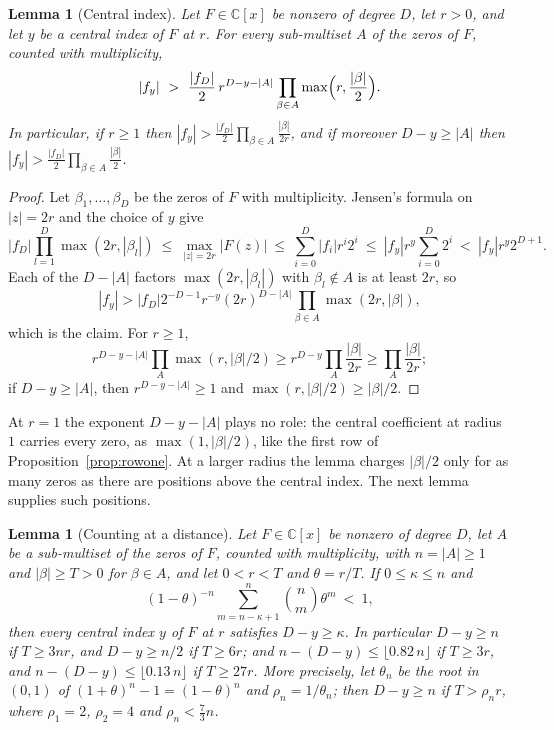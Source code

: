 \documentclass[11pt]{article}
\newtheorem{lemma}[theorem]{Lemma}
\begin{document}
\begin{lemma}[Central index]\label{lem:central}
Let $F\in\mathbb C[x]$ be nonzero of degree $D$, let $r>0$, and let $y$ be a
central index of $F$ at $r$.  For every sub-multiset $A$ of the zeros of $F$,
counted with multiplicity,
\[
  |f_y|\ >\ \frac{|f_D|}2\,r^{D-y-|A|}\prod_{\beta\in A}\max\Bigl(r,\frac{|\beta|}2\Bigr).
\]
In particular, if $r\ge1$ then $|f_y|>\frac{|f_D|}2\prod_{\beta\in A}\frac{|\beta|}{2r}$,
and if moreover $D-y\ge|A|$ then $|f_y|>\frac{|f_D|}2\prod_{\beta\in A}\frac{|\beta|}2$.
\end{lemma}

\begin{proof}
Let $\beta_1,\ldots,\beta_D$ be the zeros of $F$ with multiplicity.  Jensen's
formula on $|z|=2r$ and the choice of $y$ give
\[
  |f_D|\prod_{l=1}^D\max(2r,|\beta_l|)\ \le\ \max_{|z|=2r}|F(z)|
  \ \le\ \sum_{i=0}^D|f_i|r^i2^i\ \le\ |f_y|r^y\sum_{i=0}^D2^i\ <\ |f_y|r^y2^{D+1}.
\]
Each of the $D-|A|$ factors $\max(2r,|\beta_l|)$ with $\beta_l\notin A$ is at
least $2r$, so
\[
  |f_y|>|f_D|2^{-D-1}r^{-y}(2r)^{D-|A|}
  \prod_{\beta\in A}\max(2r,|\beta|),
\]
which is the claim.  For $r\ge1$,
\[
 r^{D-y-|A|}\prod_A\max(r,|\beta|/2)
 \ge r^{D-y}\prod_A\frac{|\beta|}{2r}
 \ge\prod_A\frac{|\beta|}{2r};
\]
if $D-y\ge|A|$, then
$r^{D-y-|A|}\ge1$ and $\max(r,|\beta|/2)\ge|\beta|/2$.
\end{proof}

At $r=1$ the exponent $D-y-|A|$ plays no role: the central coefficient at
radius $1$ carries every zero, as $\max(1,|\beta|/2)$, like the first row of
Proposition~\ref{prop:rowone}.  At a larger radius the lemma charges
$|\beta|/2$ only for as many zeros as there are positions above the central
index.  The next lemma supplies such positions.

\begin{lemma}[Counting at a distance]\label{lem:tropcount}
Let $F\in\mathbb C[x]$ be nonzero of degree $D$, let $A$ be a sub-multiset of
the zeros of $F$, counted with multiplicity, with $n=|A|\ge1$ and $|\beta|\ge
T>0$ for $\beta\in A$, and let $0<r<T$ and $\theta=r/T$.  If $0\le\kappa\le n$ and
\[
  (1-\theta)^{-n}\sum_{m=n-\kappa+1}^n\binom nm\theta^m\ <\ 1,
\]
then every central index $y$ of $F$ at $r$ satisfies $D-y\ge\kappa$.  In
particular $D-y\ge n$ if $T\ge3nr$, and $D-y\ge n/2$ if $T\ge6r$; and
$n-(D-y)\le\lfloor0.82\,n\rfloor$ if $T\ge3r$, and
$n-(D-y)\le\lfloor0.13\,n\rfloor$ if $T\ge27r$.  More precisely, let
$\theta_n$ be the root in $(0,1)$ of $(1+\theta)^n-1=(1-\theta)^n$ and
$\rho_n=1/\theta_n$; then $D-y\ge n$ if $T>\rho_nr$, where $\rho_1=2$,
$\rho_2=4$ and $\rho_n<\frac73n$.
\end{lemma}
\end{document}

